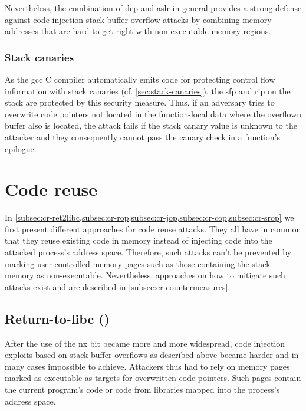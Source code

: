 Nevertheless, the combination of \gls{dep} and \gls{aslr} in general provides a strong defense against code injection stack buffer overflow attacks by combining memory addresses that are hard to get right with non-executable memory regions.

\subsubsection{Stack canaries}
\label{subsubsec:ci-stack-canaries}

As the \gls{gcc} C compiler automatically emits code for protecting control flow information with stack canaries (cf. \cref{sec:stack-canaries}), the \gls{sfp} and \gls{rip} on the stack are protected by this security measure.
Thus, if an adversary tries to overwrite code pointers not located in the function-local data where the overflown buffer also is located, the attack fails if the stack canary value is unknown to the attacker and they consequently cannot pass the canary check in a function's epilogue.

\section{Code reuse}
\label{sec:code-reuse}

In \cref{subsec:cr-ret2libc,subsec:cr-rop,subsec:cr-jop,subsec:cr-cop,subsec:cr-srop} we first present different approaches for code reuse attacks.
They all have in common that they reuse existing code in memory instead of injecting code into the attacked process's address space.
Therefore, such attacks can't be prevented by marking user-controlled memory pages such as those containing the stack memory as non-executable.
Nevertheless, approaches on how to mitigate such attacks exist and are described in \cref{subsec:cr-countermeasures}.

\subsection{Return-to-libc ()}
\label{subsec:cr-ret2libc}

After the use of the \gls{nx} bit became more and more widespread, code injection exploits based on stack buffer overflows as described \hyperref[sec:code-injection]{above} became harder and in many cases impossible to achieve.
Attackers thus had to rely on memory pages marked as executable as targets for overwritten code pointers.
Such pages contain the current program's code or code from libraries mapped into the process's address space.

